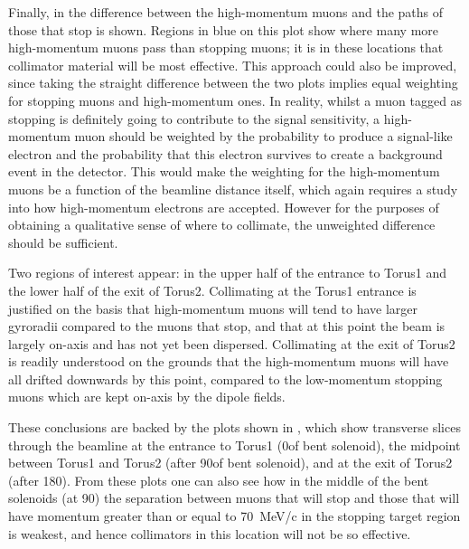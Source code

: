 Finally, in  the difference between the high-momentum muons and the paths of those that stop is shown. 
Regions in blue on this plot show where many more high-momentum muons pass than stopping muons; it is in these locations that collimator material will be most effective.
This approach could also be improved, since taking the straight difference between the two plots implies equal weighting for stopping muons and high-momentum ones.
In reality, whilst a muon tagged as stopping is definitely going to contribute to the signal sensitivity, a high-momentum muon should be weighted by the probability to produce a signal-like electron and the probability that this electron survives to create a background event in the detector.
This would make the weighting for the high-momentum muons be a function of the beamline distance itself, which again requires a study into how high-momentum electrons are accepted.
However for the purposes of obtaining a qualitative sense of where to collimate, the unweighted difference should be sufficient.

Two regions of interest appear: in the upper half of the entrance to Torus1 and the lower half of the exit of Torus2.  
Collimating at the Torus1 entrance is justified on the basis that high-momentum muons will tend to have larger gyroradii compared to the muons that stop, and that at this point the beam is largely on-axis and has not yet been dispersed.
Collimating at the exit of Torus2 is readily understood on the grounds that the high-momentum muons will have all drifted downwards by this point, compared to the low-momentum stopping muons which are kept on-axis by the dipole fields.

\FigOptimMuBeamCollimTransverseSep
These conclusions are backed by the plots shown in , which show transverse slices through the beamline at the entrance to Torus1 (0\degree of bent solenoid), the midpoint between Torus1 and Torus2 (after 90\degree of bent solenoid), and at the exit of Torus2 (after 180\degree).
From these plots one can also see how in the middle of the bent solenoids (at 90\degree) the separation between muons that will stop and those that will have momentum greater than or equal to 70~MeV/c in the stopping target region is weakest, and hence collimators in this location will not be so effective.

\FigOptimMuBeamCollimTorusOne
\FigOptimMuBeamCollimTorusTwoFraction
